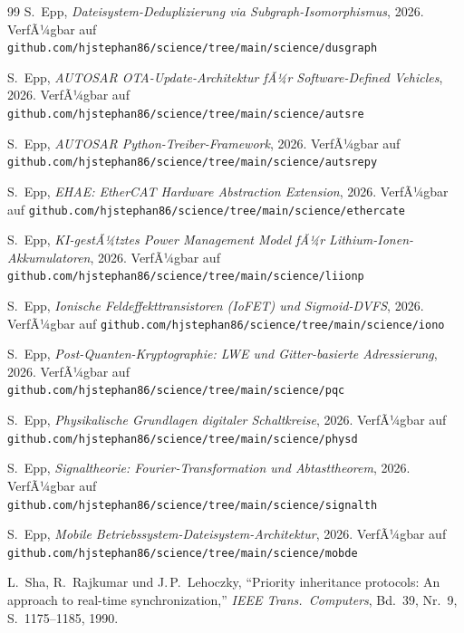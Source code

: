 ﻿\documentclass[a4paper,12pt]{scrreprt}
\theoremstyle{definition}
\begin{document}
\begin{thebibliography}{99}
		S.\ Epp,
		\textit{Dateisystem-Deduplizierung via Subgraph-Isomorphismus}, 2026. VerfÃ¼gbar auf
		\texttt{github.com/hjstephan86/science/tree/main/science/dusgraph}
		
		S.\ Epp,
		\textit{AUTOSAR OTA-Update-Architektur fÃ¼r Software-Defined Vehicles}, 2026. VerfÃ¼gbar auf
		\texttt{github.com/hjstephan86/science/tree/main/science/autsre}
		
		S.\ Epp,
		\textit{AUTOSAR Python-Treiber-Framework}, 2026. VerfÃ¼gbar auf
		\texttt{github.com/hjstephan86/science/tree/main/science/autsrepy}
		
		S.\ Epp,
		\textit{EHAE: EtherCAT Hardware Abstraction Extension}, 2026. VerfÃ¼gbar auf
		\texttt{github.com/hjstephan86/science/tree/main/science/ethercate}
		
		S.\ Epp,
		\textit{KI-gestÃ¼tztes Power Management Model fÃ¼r Lithium-Ionen-Akkumulatoren}, 2026. VerfÃ¼gbar auf \texttt{github.com/hjstephan86/science/tree/main/science/liionp}
		
		S.\ Epp,
		\textit{Ionische Feldeffekttransistoren (IoFET) und Sigmoid-DVFS}, 2026. VerfÃ¼gbar auf
		\texttt{github.com/hjstephan86/science/tree/main/science/iono}
		
		S.\ Epp,
		\textit{Post-Quanten-Kryptographie: LWE und Gitter-basierte Adressierung}, 2026. VerfÃ¼gbar auf
		\texttt{github.com/hjstephan86/science/tree/main/science/pqc}
		
		S.\ Epp,
		\textit{Physikalische Grundlagen digitaler Schaltkreise}, 2026. VerfÃ¼gbar auf
		\texttt{github.com/hjstephan86/science/tree/main/science/physd}
		
		S.\ Epp,
		\textit{Signaltheorie: Fourier-Transformation und Abtasttheorem}, 2026. VerfÃ¼gbar auf
		\texttt{github.com/hjstephan86/science/tree/main/science/signalth}
		
		S.\ Epp,
		\textit{Mobile Betriebssystem-Dateisystem-Architektur}, 2026. VerfÃ¼gbar auf
		\texttt{github.com/hjstephan86/science/tree/main/science/mobde}
		
		L.\ Sha, R.\ Rajkumar und J.\,P.\ Lehoczky,
		``Priority inheritance protocols: An approach to real-time synchronization,''
		\textit{IEEE Trans.\ Computers}, Bd.~39, Nr.~9, S.~1175--1185, 1990.
		

\end{thebibliography}
\end{document}
